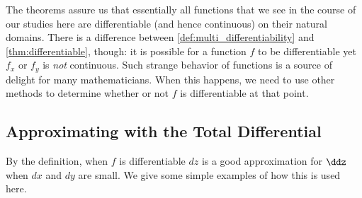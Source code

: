 The theorems assure us that essentially all functions that we see in the course of our studies here are differentiable (and hence continuous) on their natural domains. There is a difference between \autoref{def:multi_differentiability} and \autoref{thm:differentiable}, though: it is possible for a function $f$ to be differentiable yet $f_x$ or $f_y$ is \textit{not} continuous. Such strange behavior of functions is a source of delight for many mathematicians.  When this happens, we need to use other methods to determine whether or not $f$ is differentiable at that point.

%
%

\subsection{Approximating with the Total Differential}

By the definition, when $f$ is differentiable $dz$ is a good approximation for $\ddz$ when $dx$ and $dy$ are small. We give some simple examples of how this is used here.

